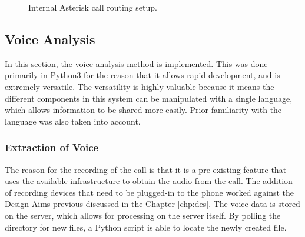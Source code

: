 \documentclass[main.tex]{subfiles}
\begin{document}
\begin{figure}[htb]
\centering
{}
	\caption{Internal Asterisk call routing setup.}
	\label{fig:asterisk-callflow}
\end{figure}

\subsection{Voice Analysis}
In this section, the voice analysis method is implemented. This was done primarily in Python3 for the reason that it allows rapid development, and is extremely versatile. The versatility is highly valuable because it means the different components in this system can be manipulated with a single language, which allows information to be shared more easily. Prior familiarity with the language was also taken into account.

\subsubsection{Extraction of Voice}
The reason for the recording of the call is that it is a pre-existing feature that uses the available infrastructure to obtain the audio from the call. The addition of recording devices that need to be plugged-in to the phone worked against the Design Aims previous discussed in the Chapter \ref{chp:des}. The voice data is stored on the server, which allows for processing on the server itself. By polling the directory for new files, a Python script is able to locate the newly created file.
\end{document}
